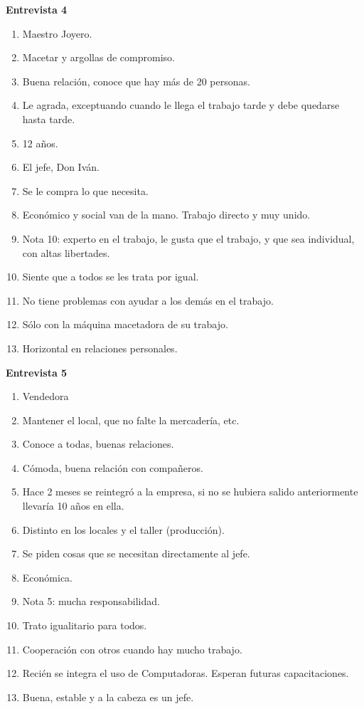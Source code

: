 \newpage
\textbf{Entrevista 4}\\
\begin{enumerate}
	\item Maestro Joyero.
	\item Macetar y argollas de compromiso.
	\item Buena relación, conoce que hay más de 20 personas.
	\item Le agrada, exceptuando cuando le llega el trabajo tarde y debe quedarse hasta tarde.
	\item 12 años.
	\item El jefe, Don Iván.
	\item Se le compra lo que necesita.
	\item Económico y social van de la mano. Trabajo directo y muy unido.
	\item Nota 10: experto en el trabajo, le gusta que el trabajo, y que sea individual, con altas libertades.
	\item Siente que a todos se les trata por igual.
	\item No tiene problemas con ayudar a los demás en el trabajo.
	\item Sólo con la máquina macetadora de su trabajo.
	\item Horizontal en relaciones personales.
\end{enumerate}


\newpage
\textbf{Entrevista 5}\\
\begin{enumerate}
	\item Vendedora
	\item Mantener el local, que no falte la mercadería, etc.
	\item Conoce a todas, buenas relaciones.
	\item Cómoda, buena relación con compañeros.
	\item Hace 2 meses se reintegró a la empresa, si no se hubiera salido anteriormente llevaría 10 años en ella.
	\item Distinto en los locales y el taller (producción). %
	\item Se piden cosas que se necesitan directamente al jefe.
	\item Económica.
	\item Nota 5: mucha responsabilidad.
	\item Trato igualitario para todos.
	\item Cooperación con otros cuando hay mucho trabajo.
	\item Recién se integra el uso de Computadoras. Esperan futuras capacitaciones.
	\item Buena, estable y a la cabeza es un jefe.
\end{enumerate}


